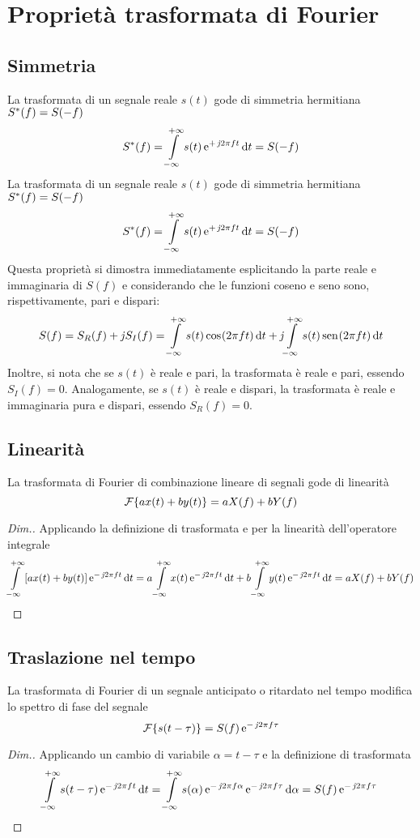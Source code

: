 \section{Proprietà trasformata di Fourier}
\subsection{Simmetria}
La trasformata di un segnale reale $s(t)$ gode di simmetria hermitiana ${S}^\ast(f)=S(-f)$
\begin{equation}{S}^\ast(f)=\int\limits_{-\infty}^{+\infty}{s(t)\operatorname{e}^{+\operatorname{\mathit{j}\!} 2\pi f t}}{\,\mathop{}\!\mathrm{d}{t}}=S(-f)\end{equation}
La trasformata di un segnale reale $s(t)$ gode di simmetria hermitiana ${S}^\ast(f)=S(-f)$
\begin{equation}{S}^\ast(f)=\int\limits_{-\infty}^{+\infty}{s(t)\operatorname{e}^{+\operatorname{\mathit{j}\!} 2\pi f t}}{\,\mathop{}\!\mathrm{d}{t}}=S(-f)\end{equation}
Questa proprietà si dimostra immediatamente esplicitando la parte reale e immaginaria di $S(f)$ e considerando che le funzioni coseno e seno sono, rispettivamente, pari e dispari: 
\[S(f)=S_R(f)+\operatorname{\mathit{j}\!} S_I(f)=\int\limits_{-\infty}^{+\infty}{s(t)\,{\operatorname{cos}}^{}\!\left({2\pi f t}\right)}{\,\mathop{}\!\mathrm{d}{t}}+\operatorname{\mathit{j}\!}\int\limits_{-\infty}^{+\infty}{s(t)\,{\operatorname{sen}}^{}\!\left({2\pi f t}\right)}{\,\mathop{}\!\mathrm{d}{t}}\]
Inoltre, si nota che  se $s(t)$ è reale e pari, la trasformata è reale e pari, essendo $S_I(f)=0$.
Analogamente, se $s(t)$ è reale e dispari, la trasformata è reale e immaginaria pura e dispari, essendo $S_R(f)=0$.

\subsection{Linearità}
La trasformata di Fourier di combinazione lineare di segnali gode di linearità
\begin{equation}
\operatorname{\mathcal{F}}\!\left\lbrace{a x(t)+ b y(t)}\right\rbrace= a X(f)+ b Y(f)
\end{equation}

\begin{proof}[Dim.]
Applicando la definizione di trasformata e per la linearità dell'operatore integrale
\[ \int\limits_{-\infty}^{+\infty}{\left[a x(t)+ b y(t)\right]\operatorname{e}^{-\operatorname{\mathit{j}\!} 2\pi f t}}{\,\mathop{}\!\mathrm{d}{t}}= a\int\limits_{-\infty}^{+\infty}{x(t)\operatorname{e}^{-\operatorname{\mathit{j}\!} 2\pi f t}}{\,\mathop{}\!\mathrm{d}{t}} + b\int\limits_{-\infty}^{+\infty}{y(t)\operatorname{e}^{-\operatorname{\mathit{j}\!} 2\pi f t}}{\,\mathop{}\!\mathrm{d}{t}}= a X(f) + b Y(f)\qedhere\]
\end{proof}

\subsection{Traslazione nel tempo}
La trasformata di Fourier di un segnale anticipato o ritardato nel tempo modifica lo spettro di fase del segnale
\begin{equation}
\fourier{s(t-\tau)}= S(f)\e{-\imath 2\pi f \tau}
\label{eq:trasf_Fourier_trasl}
\end{equation}
\begin{proof}[Dim.]
Applicando un cambio di variabile $\alpha=t-\tau$ e la definizione di trasformata
\[\int\limits_{-\infty}^{+\infty}{s(t-\tau)\operatorname{e}^{-\operatorname{\mathit{j}\!} 2\pi f t}}{\,\mathop{}\!\mathrm{d}{t}}=
\int\limits_{-\infty}^{+\infty}{s(\alpha)\operatorname{e}^{-\operatorname{\mathit{j}\!} 2\pi f\alpha}\operatorname{e}^{-\operatorname{\mathit{j}\!} 2\pi f\tau}}{\,\mathop{}\!\mathrm{d}{\alpha}}=S(f)\operatorname{e}^{-\operatorname{\mathit{j}\!} 2\pi f\tau}\qedhere\]
\end{proof}

